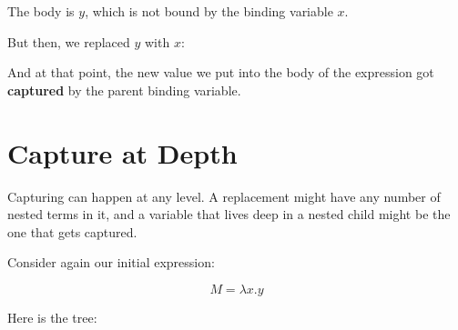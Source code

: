 \documentclass{book}
\numberwithin{equation}{chapter}
\newcommand{\vocab}{\textbf}
\begin{document}
\begin{center}
\end{center}

\noindent
The body is $y$, which is not bound by the binding variable $x$.

But then, we replaced $y$ with $x$:

\begin{center}
\end{center}

\noindent
And at that point, the new value we put into the body of the expression got \vocab{captured} by the parent binding variable.


\section{Capture at Depth}

Capturing can happen at any level. A replacement might have any number of nested terms in it, and a variable that lives deep in a nested child might be the one that gets captured. 

Consider again our initial expression:

\begin{equation}
M = \lambda x.y
\end{equation}

\noindent
Here is the tree:

\begin{center}
\end{center}
\end{document}
